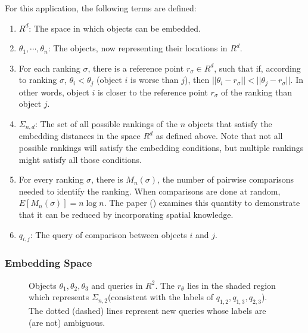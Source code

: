 \documentclass[
  letterpaper,
  numbers=noenddot,
  DIV=11]{scrreprt}
\theoremstyle{definition}
\theoremstyle{plain}
\theoremstyle{plain}
\theoremstyle{remark}
\begin{document}
For this application, the following terms are defined:

\begin{enumerate}
\def\labelenumi{\arabic{enumi}.}
\item
  \textbf{\(R^d\)}: The space in which objects can be embedded.
\item
  \textbf{\(\theta_1, \cdots,\theta_n\)}: The objects, now representing
  their locations in \(R^d\).
\item
  For each ranking \(\sigma\), there is a reference point
  \(r_{\sigma} \in R^d\), such that if, according to ranking \(\sigma\),
  \(\theta_{i} < \theta_{j}\) (object \(i\) is worse than \(j\)), then
  \(||\theta_i - r_{\sigma}|| < ||\theta_j - r_{\sigma}||\). In other
  words, object \(i\) is closer to the reference point \(r_{\sigma}\) of
  the ranking than object \(j\).
\item
  \textbf{\(\Sigma_{n,d}\)}: The set of all possible rankings of the
  \(n\) objects that satisfy the embedding distances in the space
  \(R^d\) as defined above. Note that not all possible rankings will
  satisfy the embedding conditions, but multiple rankings might satisfy
  all those conditions.
\item
  For every ranking \(\sigma\), there is \(M_n(\sigma)\), the number of
  pairwise comparisons needed to identify the ranking. When comparisons
  are done at random, \(E[M_n(\sigma)] = n\log n\). The paper
  () examines this quantity
  to demonstrate that it can be reduced by incorporating spatial
  knowledge.
\item
  \textbf{\(q_{i,j}\)}: The query of comparison between objects \(i\)
  and \(j\).
\end{enumerate}

\subsubsection*{Embedding Space}\label{embedding-space}

\begin{figure}


\caption{\label{fig-dim-space}Objects \(\theta_1, \theta_2, \theta_3\)
and queries in \(R^2\). The \(r_\theta\) lies in the shaded region which
represents \(\Sigma_{n,2}\)(consistent with the labels of
\(q_{1,2}, q_{1,3}, q_{2,3}\)). The dotted (dashed) lines represent new
queries whose labels are (are not) ambiguous.}

\end{figure}%
\end{document}
